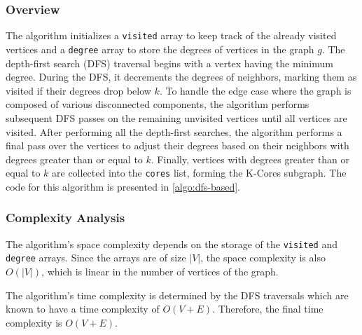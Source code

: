 \subsubsection{Overview}

The algorithm initializes a \texttt{visited} array to keep track of the already visited vertices and a \texttt{degree} array to store the degrees of vertices in the graph \(g\). The depth-first search (DFS) traversal begins with a vertex having the minimum degree. During the DFS, it decrements the degrees of neighbors, marking them as visited if their degrees drop below \(k\). To handle the edge case where the graph is composed of various disconnected components, the algorithm performs subsequent DFS passes on the remaining unvisited vertices until all vertices are visited. After performing all the depth-first searches, the algorithm performs a final pass over the vertices to adjust their degrees based on their neighbors with degrees greater than or equal to \(k\). Finally, vertices with degrees greater than or equal to \(k\) are collected into the \texttt{cores} list, forming the K-Cores subgraph. The code for this algorithm is presented in \ref{algo:dfs-based}.



\subsubsection{Complexity Analysis}

The algorithm's space complexity depends on the storage of the \texttt{visited} and \texttt{degree} arrays. Since the arrays are of size \(|V|\), the space complexity is also \(O(|V|)\), which is linear in the number of vertices of the graph.

The algorithm's time complexity is determined by the DFS traversals which are known to have a time complexity of \(O(V + E)\). Therefore, the final time complexity is \(O(V + E)\).
    
    